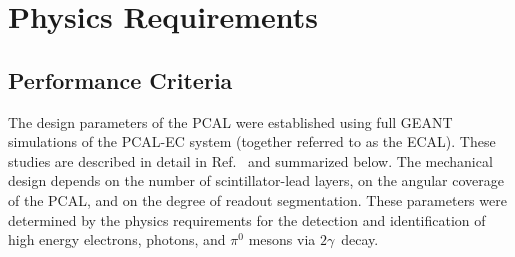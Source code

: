 \section{Physics Requirements}

\subsection{Performance Criteria}
The design parameters of the PCAL were established using full GEANT simulations of the PCAL-EC system
(together referred to as the ECAL). These studies are described in detail in Ref.~\cite{2007001} and
summarized below. The mechanical design depends on the number of scintillator-lead layers, on the angular
coverage of the PCAL, and on the degree of readout segmentation. These parameters were determined by
the physics requirements for the detection and identification of high energy electrons, photons, and $\pi^{0}$
mesons via $2\gamma$\ decay.

